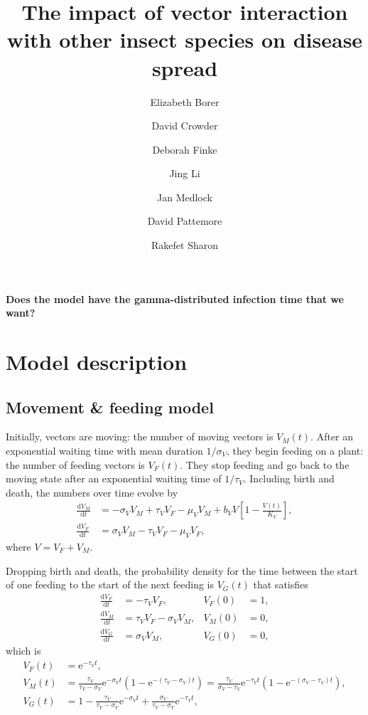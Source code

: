 \documentclass{article}
\title{The impact of vector interaction with other insect species on
  disease spread}
\author{
  Elizabeth Borer
  \and
  David Crowder
  \and
  Deborah Finke
  \and
  Jing Li
  \and
  Jan Medlock
  \and
  David Pattemore
  \and
  Rakefet Sharon
}
\newcommand{\md}{\mathrm{d}}
\newcommand{\me}{\mathrm{e}}
\begin{document}
\maketitle

\textbf{Does the model have the gamma-distributed infection time that
  we want?}


\section{Model description}


\subsection{Movement \& feeding model}

Initially, vectors are moving: the number of moving vectors is
$V_M(t)$.  After an exponential waiting time with mean duration
$1 / \sigma_V$, they begin feeding on a plant: the number of feeding
vectors is $V_F(t)$.  They stop feeding and go back to the moving
state after an exponential waiting time of $1 / \tau_V$.  Including
birth and death, the numbers over time evolve by
\begin{equation}
  \begin{split}
    \frac{\md V_M}{\md t} &=
    - \sigma_V V_M + \tau_V V_F - \mu_V V_M
    + b_V V \left[1 - \frac{V(t)}{K_V}\right],
    \\
    \frac{\md V_F}{\md t} &=
    \sigma_V V_M - \tau_V V_F - \mu_V V_F,
  \end{split}
\end{equation}
where $V = V_F + V_M$.

Dropping birth and death, the probability density for the time between
the start of one feeding to the start of the next feeding is $V_G(t)$
that satisfies
\begin{equation}
  \begin{aligned}
    \frac{\md V_F}{\md t} &=
    - \tau_V V_F,
    & V_F(0) &= 1,
    \\
    \frac{\md V_M}{\md t} &=
    \tau_V V_F - \sigma_V V_M,
    & V_M(0) &= 0,
    \\
    \frac{\md V_G}{\md t} &=
    \sigma_V V_M,
    & V_G(0) &= 0,
  \end{aligned}
\end{equation}
which is
\begin{equation}
  \begin{split}
    V_F(t) &= \me^{-\tau_V t},
    \\
    V_M(t) &= \frac{\tau_V}{\tau_V - \sigma_V}
    \me^{- \sigma_V t} \left(
      1 - \me^{- (\tau_V -\sigma_V) t}
    \right)
    = \frac{\tau_V}{\sigma_V - \tau_V}
    \me^{- \tau_V t} \left(
      1 - \me^{- (\sigma_V - \tau_V) t}
    \right),
    \\
    V_G(t) &= 1
    - \frac{\tau_V}{\tau_V - \sigma_V} \me^{- \sigma_V t}
    + \frac{\sigma_V}{\tau_V - \sigma_V} \me^{- \tau_V t},
  \end{split}
\end{equation}
\end{document}
